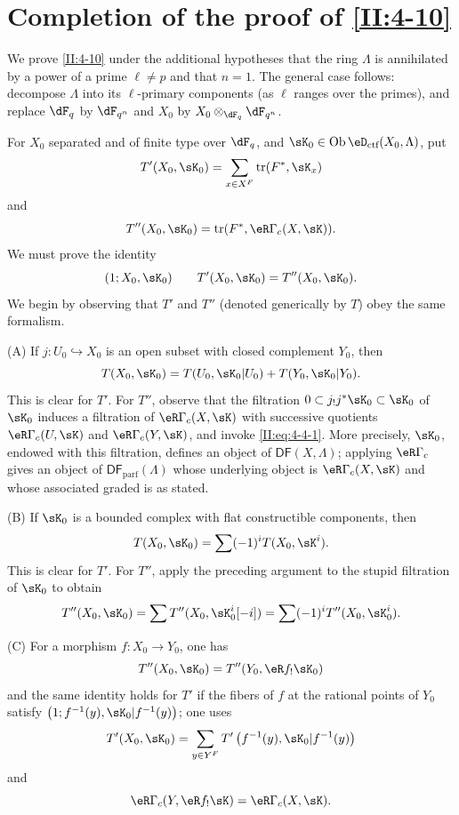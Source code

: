 \documentclass[12pt,oneside,english]{smfbook}
\DeclareMathOperator{\ob}{Ob}
\DeclareMathOperator{\tr}{tr}
\begin{document}
\section{Completion of the proof of \ref{II:4-10}}\label{II:6}

We prove \ref{II:4-10} under the additional hypotheses that the ring $\Lambda$ is annihilated by a power of a prime $\ell\ne p$ and that $n=1$. The general case follows: decompose $\Lambda$ into its $\ell$-primary components (as $\ell$ ranges over the primes), and replace $\dF_q$ by $\dF_{q^n}$ and $X_0$ by $X_0\otimes_{\dF_q}\dF_{q^n}$.

For $X_0$ separated and of finite type over $\dF_q$, and $\sK_0\in\ob\eD_\text{ctf}(X_0,\Lambda)$, put
\[
  T'(X_0,\sK_0) = \sum_{x\in X^F} \tr(F^*,\sK_x)
\]
and
\[
  T''(X_0,\sK_0) = \tr(F^*,\eR\Gamma_c(X,\sK)) \text{.}
\]
We must prove the identity
\[
  (1;X_0,\sK_0) \qquad T'(X_0,\sK_0) = T''(X_0,\sK_0) \text{.}
\]
We begin by observing that $T'$ and $T''$ (denoted generically by $T$) obey the same formalism.

(A) If $j:U_0\hookrightarrow X_0$ is an open subset with closed complement $Y_0$, then
\[
  T(X_0,\sK_0) = T(U_0,\sK_0|U_0) + T(Y_0,\sK_0|Y_0) \text{.}
\]
This is clear for $T'$. For $T''$, observe that the filtration $0\subset j_!j^*\sK_0\subset\sK_0$ of $\sK_0$ induces a filtration of $\eR\Gamma_c(X,\sK)$ with successive quotients $\eR\Gamma_c(U,\sK)$ and $\eR\Gamma_c(Y,\sK)$, and invoke \eqref{II:eq:4-4-1}. More precisely, $\sK_0$, endowed with this filtration, defines an object of $\mathsf{DF}(X,\Lambda)$; applying $\eR\Gamma_c$ gives an object of $\mathsf{DF}_\text{parf}(\Lambda)$ whose underlying object is $\eR\Gamma_c(X,\sK)$ and whose associated graded is as stated.

(B) If $\sK_0$ is a bounded complex with flat constructible components, then
\[
  T(X_0,\sK_0) = \sum (-1)^i T(X_0,\sK^i) \text{.}
\]
This is clear for $T'$. For $T''$, apply the preceding argument to the stupid filtration of $\sK_0$ to obtain
\[
  T''(X_0,\sK_0) = \sum T''(X_0,\sK_0^i[-i]) = \sum (-1)^i T''(X_0,\sK_0^i) \text{.}
\]

(C) For a morphism $f:X_0\to Y_0$, one has
\[
  T''(X_0,\sK_0) = T''(Y_0,\eR f_! \sK_0)
\]
and the same identity holds for $T'$ if the fibers of $f$ at the rational points of $Y_0$ satisfy $\left(1;f^{-1}(y),\sK_0|f^{-1}(y)\right)$; one uses
\[
  T'(X_0,\sK_0) = \sum_{y\in Y^F} T'\left(f^{-1}(y), \sK_0|f^{-1}(y)\right)
\]
and
\[
  \eR\Gamma_c(Y, \eR f_! \sK) = \eR\Gamma_c(X,\sK) \text{.}
\]
\end{document}
